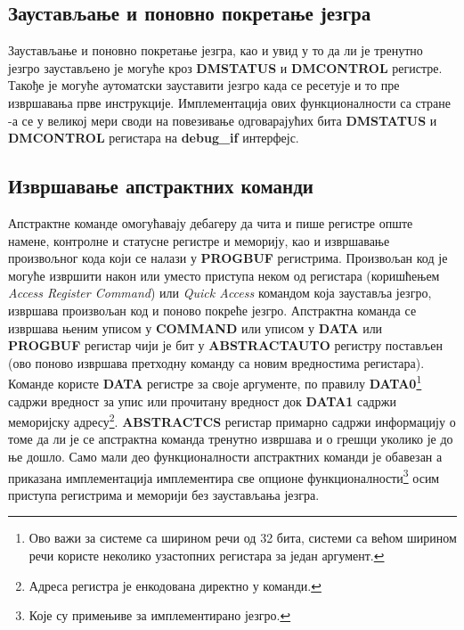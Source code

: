 \subsection{Заустављање и поновно покретање језгра}

Заустављање и поновно покретање језгра, као и увид у то да ли је тренутно језгро заустављено је могуће кроз \textbf{\acrshort{DMSTATUS}} и \textbf{\acrshort{DMCONTROL}} регистре. Такође је могуће аутоматски зауставити језгро када се ресетује и то пре извршавања прве инструкције. Имплементација ових функционалности са стране -а се у великој мери своди на повезивање одговарајућих бита \textbf{\acrshort{DMSTATUS}} и \textbf{\acrshort{DMCONTROL}} регистара на \textbf{debug\_if} интерфејс.

\subsection{Извршавање апстрактних команди}

Апстрактне команде омогућавају дебагеру да чита и пише регистре опште намене, контролне и статусне регистре и меморију, као и извршавање произвољног кода који се налази у \textbf{\acrshort{PROGBUF}} регистрима. Произвољан код је могуће извршити након или уместо приступа неком од регистара (коришћењем \textit{Access Register Command}) или \textit{Quick Access} командом која зауставља језгро, извршава произвољан код и поново покреће језгро. Апстрактна команда се извршава њеним уписом у \textbf{COMMAND} или уписом у \textbf{DATA} или \textbf{\acrshort{PROGBUF}} регистар чији је бит у \textbf{ABSTRACTAUTO} регистру постављен (ово поново извршава претходну команду са новим вредностима регистара). Команде користе \textbf{DATA} регистре за своје аргументе, по правилу  \textbf{DATA0}\footnote{Ово важи за системе са ширином речи од 32 бита, системи са већом ширином речи користе неколико узастопних регистара за један аргумент.} садржи вредност за упис или прочитану вредност док \textbf{DATA1} садржи меморијску адресу\footnote{Адреса регистра је енкодована директно у команди.}. \textbf{\acrshort{ABSTRACTCS}} регистар примарно садржи информацију о томе да ли је се апстрактна команда тренутно извршава и о грешци уколико је до ње дошло. Само мали део функционалности апстрактних команди је обавезан а приказана имплементација имплементира све опционе функционалности\footnote{Које су примењиве за имплементирано језгро.} осим приступа регистрима и меморији без заустављања језгра.

